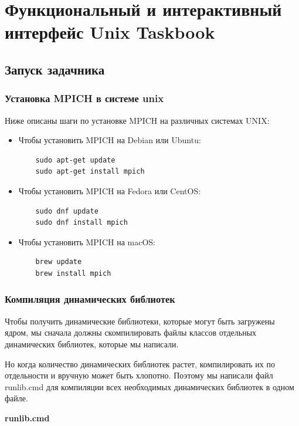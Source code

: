 \section{Функциональный и интерактивный интерфейс Unix Taskbook}

\subsection{Запуск задачника}

\subsubsection{Установка MPICH в системе unix}
Ниже описаны шаги по установке MPICH на различных системах UNIX:

\begin{itemize}
    \item Чтобы установить MPICH на Debian или Ubuntu:
    \lstset{language=bash}
    \begin{lstlisting}
    sudo apt-get update
    sudo apt-get install mpich
    \end{lstlisting}
    \item Чтобы установить MPICH на Fedora или CentOS:
    \lstset{language=bash}
    \begin{lstlisting}
    sudo dnf update
    sudo dnf install mpich
    \end{lstlisting}
    \item Чтобы установить MPICH на macOS:
    \begin{lstlisting}
    brew update
    brew install mpich        
    \end{lstlisting}
\end{itemize}

\subsubsection{Компиляция динамических библиотек}

Чтобы получить динамические библиотеки, которые могут быть загружены ядром, мы 
сначала должны скомпилировать файлы классов отдельных динамических библиотек, которые мы написали.

Но когда количество динамических библиотек растет, компилировать их по отдельности и 
вручную может быть хлопотно. Поэтому мы написали файл runlib.cmd для компиляции всех 
необходимых динамических библиотек в одном файле.

\centerline{\textbf{runlib.cmd}}

